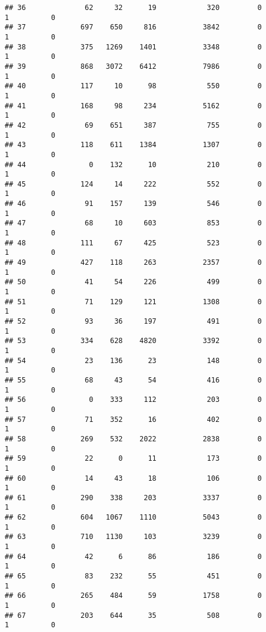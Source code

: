 \documentclass[
]{article}
\begin{document}
\begin{verbatim}
## 36              62     32      19            320         0         1          0
## 37             697    650     816           3842         0         1          0
## 38             375   1269    1401           3348         0         1          0
## 39             868   3072    6412           7986         0         1          0
## 40             117     10      98            550         0         1          0
## 41             168     98     234           5162         0         1          0
## 42              69    651     387            755         0         1          0
## 43             118    611    1384           1307         0         1          0
## 44               0    132      10            210         0         1          0
## 45             124     14     222            552         0         1          0
## 46              91    157     139            546         0         1          0
## 47              68     10     603            853         0         1          0
## 48             111     67     425            523         0         1          0
## 49             427    118     263           2357         0         1          0
## 50              41     54     226            499         0         1          0
## 51              71    129     121           1308         0         1          0
## 52              93     36     197            491         0         1          0
## 53             334    628    4820           3392         0         1          0
## 54              23    136      23            148         0         1          0
## 55              68     43      54            416         0         1          0
## 56               0    333     112            203         0         1          0
## 57              71    352      16            402         0         1          0
## 58             269    532    2022           2838         0         1          0
## 59              22      0      11            173         0         1          0
## 60              14     43      18            106         0         1          0
## 61             290    338     203           3337         0         1          0
## 62             604   1067    1110           5043         0         1          0
## 63             710   1130     103           3239         0         1          0
## 64              42      6      86            186         0         1          0
## 65              83    232      55            451         0         1          0
## 66             265    484      59           1758         0         1          0
## 67             203    644      35            508         0         1          0

\end{verbatim}
\end{document}
